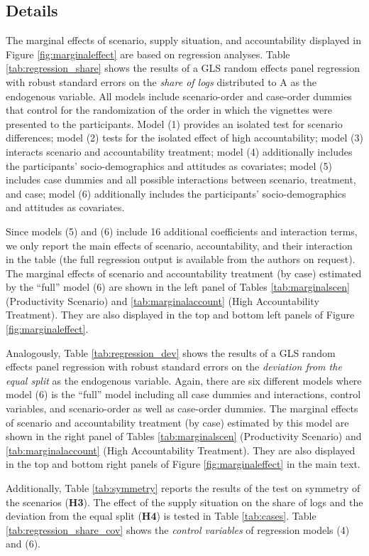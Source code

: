 \documentclass[smallcondensed]{svjour3}
\begin{document}
\subsection*{Details}
The marginal effects of scenario, supply situation, and accountability displayed in Figure \ref{fig:marginaleffect} are based on regression analyses. Table \ref{tab:regression_share} shows the results of a GLS random effects panel regression with robust standard errors on the \textit{share of logs} distributed to A as the endogenous variable. All models include scenario-order and case-order dummies that control for the randomization of the order in which the vignettes were presented to the participants. Model (1) provides an isolated test for scenario differences; model (2) tests for the isolated effect of high accountability; model (3) interacts scenario and accountability treatment; model (4) additionally includes the participants' socio-demographics and attitudes as covariates; model (5) includes case dummies and all possible interactions between scenario, treatment, and case; model (6) additionally includes the participants' socio-demographics and attitudes as covariates.\par
%
Since models (5) and (6) include 16 additional coefficients and interaction terms, we only report the main effects of scenario, accountability, and their interaction in the table (the full regression output is available from the authors on request). The marginal effects of scenario and accountability treatment (by case) estimated by the ``full'' model (6) are shown in the left panel of Tables \ref{tab:marginalscen} (Productivity Scenario) and \ref{tab:marginalaccount} (High Accountability Treatment). They are also displayed in the top and bottom left panels of Figure \ref{fig:marginaleffect}.\par
%
Analogously, Table \ref{tab:regression_dev} shows the results of a GLS random effects panel regression with robust standard errors on the \textit{deviation from the equal split} as the endogenous variable. Again, there are six different models where model (6) is the ``full'' model including all case dummies and interactions, control variables, and scenario-order as well as case-order dummies. The marginal effects of scenario and accountability treatment (by case) estimated by this model are shown in the right panel of Tables \ref{tab:marginalscen} (Productivity Scenario) and \ref{tab:marginalaccount} (High Accountability Treatment). They are also displayed in the top and bottom right panels of Figure \ref{fig:marginaleffect} in the main text.\par
%
Additionally, Table \ref{tab:symmetry} reports the results of the test on symmetry of the scenarios (\textbf{H3}). The effect of the supply situation on the share of logs and the deviation from the equal split (\textbf{H4}) is tested in Table \ref{tab:cases}. Table \ref{tab:regression_share_cov} shows the \textit{control variables} of regression models (4) and (6).\par
%
\end{document}
